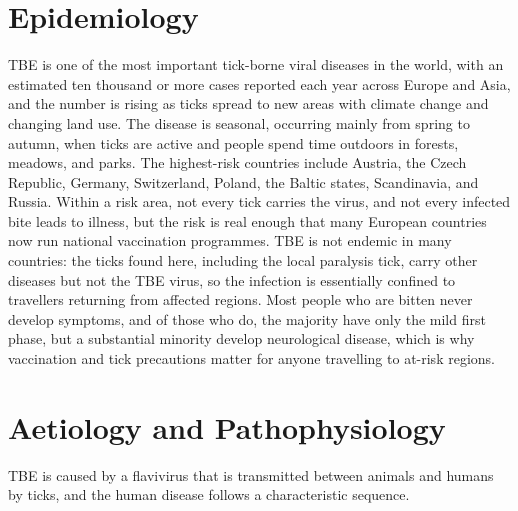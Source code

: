 \section*{Epidemiology}
TBE is one of the most important tick-borne viral diseases in the world, with an estimated ten thousand or more cases reported each year across Europe and Asia, and the number is rising as ticks spread to new areas with climate change and changing land use. The disease is seasonal, occurring mainly from spring to autumn, when ticks are active and people spend time outdoors in forests, meadows, and parks. The highest-risk countries include Austria, the Czech Republic, Germany, Switzerland, Poland, the Baltic states, Scandinavia, and Russia. Within a risk area, not every tick carries the virus, and not every infected bite leads to illness, but the risk is real enough that many European countries now run national vaccination programmes. TBE is not endemic in many countries: the ticks found here, including the local paralysis tick, carry other diseases but not the TBE virus, so the infection is essentially confined to travellers returning from affected regions. Most people who are bitten never develop symptoms, and of those who do, the majority have only the mild first phase, but a substantial minority develop neurological disease, which is why vaccination and tick precautions matter for anyone travelling to at-risk regions.

\section*{Aetiology and Pathophysiology}
TBE is caused by a flavivirus that is transmitted between animals and humans by ticks, and the human disease follows a characteristic sequence.

